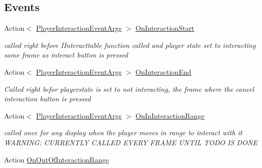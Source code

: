 \subsection*{Events}
\begin{DoxyCompactItemize}
\item 
Action$<$ \mbox{\hyperlink{class_player_interaction_event_args}{Player\+Interaction\+Event\+Args}} $>$ \mbox{\hyperlink{class_player_a22eae36e514445cac4172890ed186638}{On\+Interaction\+Start}}
\begin{DoxyCompactList}\small\item\em called right before I\+Interacttable function called and player state set to interacting same frame as interact button is pressed \end{DoxyCompactList}\item 
Action$<$ \mbox{\hyperlink{class_player_interaction_event_args}{Player\+Interaction\+Event\+Args}} $>$ \mbox{\hyperlink{class_player_a08a7813ef2273b80058d734256218cff}{On\+Interaction\+End}}
\begin{DoxyCompactList}\small\item\em Called right befor playerstate is set to not interacting, the frame where the cancel interaction button is pressed \end{DoxyCompactList}\item 
Action$<$ \mbox{\hyperlink{class_player_interaction_event_args}{Player\+Interaction\+Event\+Args}} $>$ \mbox{\hyperlink{class_player_a6da2c61e5e06e970835852ed3d65157c}{On\+In\+Interaction\+Range}}
\begin{DoxyCompactList}\small\item\em called once for any display when the player moves in range to interact with it W\+A\+R\+N\+I\+NG\+: C\+U\+R\+R\+E\+N\+T\+LY C\+A\+L\+L\+ED E\+V\+E\+RY F\+R\+A\+ME U\+N\+T\+IL T\+O\+DO IS D\+O\+NE \end{DoxyCompactList}\item 
Action \mbox{\hyperlink{class_player_ad50fff09d9eef70c9884f232010cb859}{On\+Out\+Of\+Interaction\+Range}}
\end{DoxyCompactItemize}
